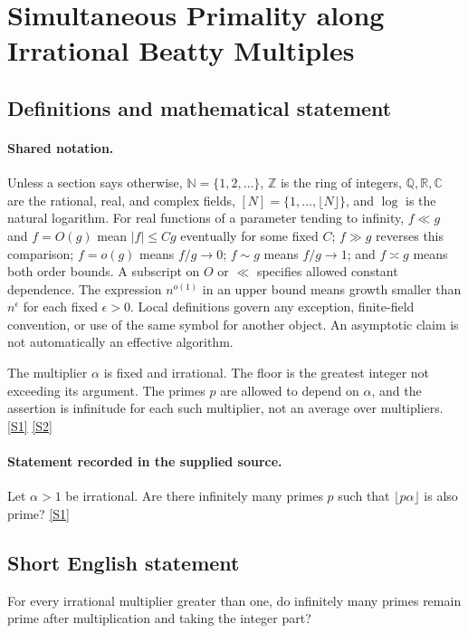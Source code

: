 \documentclass[11pt,a4paper]{article}
\newcommand{\N}{\mathbb{N}}
\newcommand{\Z}{\mathbb{Z}}
\newcommand{\Q}{\mathbb{Q}}
\newcommand{\R}{\mathbb{R}}
\newcommand{\C}{\mathbb{C}}
\newcommand{\sref}[2]{\hyperlink{source:#1:#2}{[S#2]}}
\begin{document}
\section{Simultaneous Primality along Irrational Beatty Multiples}\label{statement}


\subsection{Definitions and mathematical statement}

\paragraph{Shared notation.}Unless a section says otherwise, $\N=\{1,2,\ldots\}$,
$\Z$ is the ring of integers, $\Q,\R,\C$ are the rational, real, and complex
fields, $[N]=\{1,\ldots,\lfloor N\rfloor\}$, and $\log$ is the natural
logarithm. For real functions of a parameter tending to infinity,
$f\ll g$ and $f=O(g)$ mean $|f|\leq Cg$ eventually for some fixed $C$;
$f\gg g$ reverses this comparison; $f=o(g)$ means $f/g\to0$;
$f\sim g$ means $f/g\to1$; and $f\asymp g$ means both order bounds.
A subscript on $O$ or $\ll$ specifies allowed constant dependence.
The expression $n^{o(1)}$ in an upper bound means growth smaller than
$n^\epsilon$ for each fixed $\epsilon>0$. Local definitions govern any
exception, finite-field convention, or use of the same symbol for another
object. An asymptotic claim is not automatically an effective algorithm.



The multiplier $\alpha$ is fixed and irrational. The floor is the greatest integer not exceeding its argument. The primes $p$ are allowed to depend on $\alpha$, and the assertion is infinitude for each such multiplier, not an average over multipliers. \sref{statement}{1} \sref{statement}{2}

\paragraph{Statement recorded in the supplied source.}
Let $\alpha>1$ be irrational. Are there infinitely many primes $p$ such that $\lfloor p\alpha\rfloor$ is also prime? \sref{statement}{1}

\subsection{Short English statement}

For every irrational multiplier greater than one, do infinitely many primes remain prime after multiplication and taking the integer part?
\end{document}
